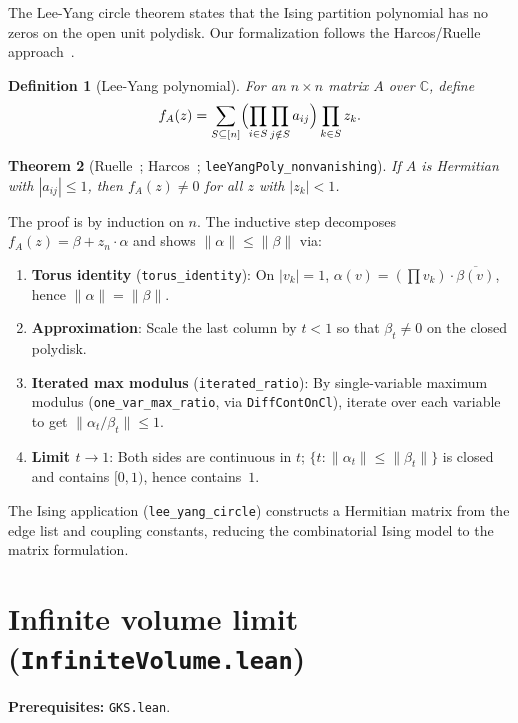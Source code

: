 \documentclass[a4paper,11pt]{article}
\newtheorem{theorem}{Theorem}
\newtheorem{definition}[theorem]{Definition}
\begin{document}
The Lee-Yang circle theorem states that the Ising partition polynomial
has no zeros on the open unit polydisk. Our formalization follows the
Harcos/Ruelle approach~\cite{harcos, ruelle}.

\begin{definition}[Lee-Yang polynomial]
For an $n\times n$ matrix $A$ over $\mathbb{C}$, define
\[
  f_A(z) = \sum_{S\subseteq [n]}
    \Bigl(\prod_{i\in S}\prod_{j\notin S} a_{ij}\Bigr)\prod_{k\in S} z_k.
\]
\end{definition}

\begin{theorem}[Ruelle~{\cite[Theorem~1, p.~589]{ruelle}};
  Harcos~{\cite[Theorem~3, p.~2]{harcos}};
  \texttt{leeYangPoly\_nonvanishing}]
If $A$ is Hermitian with $|a_{ij}|\le 1$, then $f_A(z)\ne 0$
for all $z$ with $|z_k|<1$.
\end{theorem}

The proof is by induction on $n$. The inductive step decomposes
$f_A(z)=\beta + z_n\cdot\alpha$ and shows $\|\alpha\|\le\|\beta\|$
via:
\begin{enumerate}
\item \textbf{Torus identity} (\texttt{torus\_identity}):
  On $|v_k|=1$,
  $\alpha(v) = (\prod v_k)\cdot\overline{\beta(v)}$,
  hence $\|\alpha\|=\|\beta\|$.
\item \textbf{Approximation}: Scale the last column by $t<1$
  so that $\beta_t\ne 0$ on the closed polydisk.
\item \textbf{Iterated max modulus} (\texttt{iterated\_ratio}):
  By single-variable maximum modulus
  (\texttt{one\_var\_max\_ratio}, via \texttt{DiffContOnCl}),
  iterate over each variable to get $\|\alpha_t/\beta_t\|\le 1$.
\item \textbf{Limit $t\to 1$}: Both sides are continuous in $t$;
  $\{t:\|\alpha_t\|\le\|\beta_t\|\}$ is closed and contains
  $[0,1)$, hence contains~$1$.
\end{enumerate}

The Ising application (\texttt{lee\_yang\_circle}) constructs a
Hermitian matrix from the edge list and coupling constants, reducing
the combinatorial Ising model to the matrix formulation.

\section{Infinite volume limit (\texttt{InfiniteVolume.lean})}

\par\noindent\textbf{Prerequisites:} \texttt{GKS.lean}.
\end{document}
